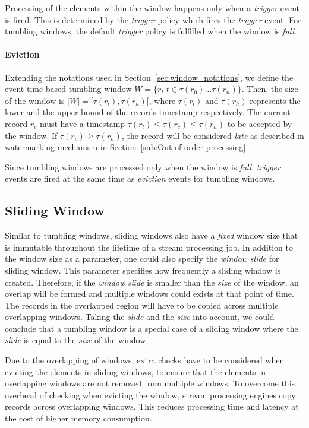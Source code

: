 Processing of the elements within the window happens only when a \emph{trigger}
event is fired. This is determined by the \emph{trigger} policy which fires the 
\emph{trigger} event. For tumbling windows, the default \emph{trigger} policy is 
fulfilled when the window is \emph{full}.


\paragraph{Eviction}%
Extending the notations used in Section~\ref{sec:window_notations}, we define 
the event time based tumbling window $W = \{r_t |  t \in \tau(r_0) \dots \tau(r_n) \}$. 
Then, the size of the window is $|W| = [\tau(r_l), \tau(r_h)[$, where  
$\tau(r_l)$ and $\tau(r_h)$ represents the lower and the upper bound of the 
records timestamp respectively. 
The current record $r_c$ must have a timestamp  $\tau(r_l) \le \tau(r_c) \le \tau(r_h)$ 
to be accepted by the window. If $\tau(r_c) \ge \tau(r_h)$, the record will be 
considered \emph{late} as described in watermarking mechanism in Section~\ref{sub:Out of order processing}. 


Since tumbling windows are processed only when the window is \emph{full}, \emph{trigger} events 
are fired at the same time as \emph{eviction} events for tumbling windows.


\subsection{Sliding Window}%
\label{sec:Sliding Window}
Similar to tumbling windows, sliding windows also have a \emph{fixed} window size 
that is immutable throughout the lifetime of a stream processing job. 
In addition to the window size as a parameter, one could also specify the 
\emph{window slide} for sliding window. This parameter specifies how frequently 
a sliding window is created. 
Therefore, if the \emph{window slide} is smaller 
than the \emph{size} of the window, an overlap will be formed and multiple 
windows could exists at that point of time. The records in the overlapped region 
will have to be copied across multiple overlapping windows. 
Taking the \emph{slide} and the \emph{size} into account, we could conclude that 
a tumbling window is a special case of a sliding window where the \emph{slide} is 
equal to the \emph{size} of the window.

Due to the overlapping of windows, extra checks have to be considered 
when evicting the elements in sliding windows, to ensure that the elements in 
overlapping windows are not removed from multiple windows. To overcome this overhead 
of checking when evicting the window, 
stream processing engines copy records across overlapping windows. 
This reduces processing time and latency at the cost of higher memory consumption.

